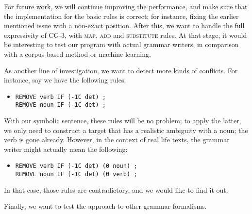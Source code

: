 For future work, we will continue improving the performance, and make sure that the implementation for the basic rules is correct; for instance, fixing the earlier mentioned issue with a non-exact position.
After this, we want to handle the full expressivity of CG-3, with \textsc{map}, \textsc{add} and \textsc{substitute} rules.
At that stage, it would be interesting to test our program with actual grammar writers,
in comparison with a corpus-based method or machine learning.

As another line of investigation, we want to detect more kinds of conflicts.
For instance, say we have the following rules:

\begin{itemize}
\item[] \begin{verbatim}
REMOVE verb IF (-1C det) ;
REMOVE noun IF (-1C det) ;
\end{verbatim}
\end{itemize}

With our symbolic sentence, these rules will be no problem; to apply the latter, we only need to construct a target that has a realistic ambiguity with a noun; the verb is gone already.
However, in the context of real life texts, the grammar writer might actually mean the following:

\begin{itemize}
\item[] \begin{verbatim}
REMOVE verb IF (-1C det) (0 noun) ;
REMOVE noun IF (-1C det) (0 verb) ;
\end{verbatim}
\end{itemize}

In that case, those rules are contradictory, and we would like to find it out.

Finally, we want to test the approach to other grammar formalisms.




